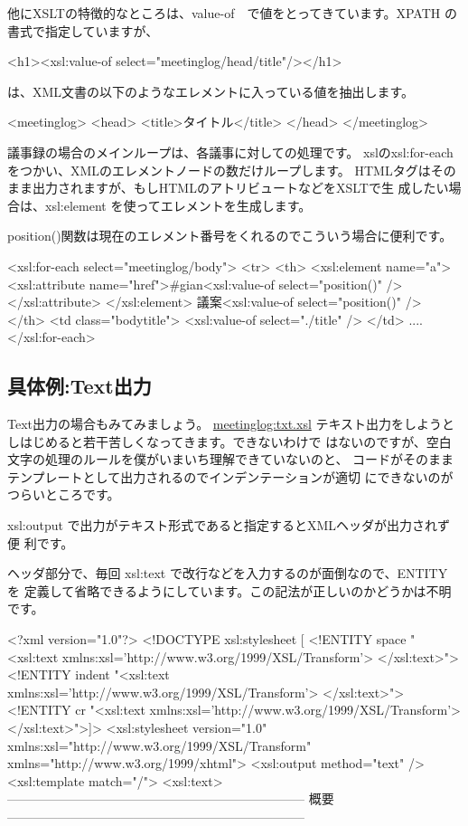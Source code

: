 \documentclass[mingoth,a4paper]{jsarticle}
\begin{document}
他にXSLTの特徴的なところは、value-of　で値をとってきています。XPATH
の書式で指定していますが、
\begin{commandline}
	<h1><xsl:value-of select="meetinglog/head/title"/></h1>
\end{commandline}

は、XML文書の以下のようなエレメントに入っている値を抽出します。
\begin{commandline}
 <meetinglog>
   <head>
     <title>タイトル</title>
   </head>
 </meetinglog> 
\end{commandline}

議事録の場合のメインループは、各議事に対しての処理です。
xslのxsl:for-eachをつかい、XMLのエレメントノードの数だけループします。
HTMLタグはそのまま出力されますが、もしHTMLのアトリビュートなどをXSLTで生
成したい場合は、xsl:element を使ってエレメントを生成します。

position()関数は現在のエレメント番号をくれるのでこういう場合に便利です。

\begin{commandline}
           <xsl:for-each select="meetinglog/body">
	      <tr>
		<th>
		  <xsl:element name="a">
		    <xsl:attribute name="href">#gian<xsl:value-of select="position()" /></xsl:attribute>
		  </xsl:element>
		  議案<xsl:value-of select="position()" />
		</th>
		<td class="bodytitle">
		  <xsl:value-of select="./title" />
		</td>
 ....
 </xsl:for-each> 
\end{commandline}

\subsection{具体例:Text出力}

Text出力の場合もみてみましょう。
\url{meetinglog:txt.xsl}
テキスト出力をしようとしはじめると若干苦しくなってきます。できないわけで
はないのですが、空白文字の処理のルールを僕がいまいち理解できていないのと、
コードがそのままテンプレートとして出力されるのでインデンテーションが適切
にできないのがつらいところです。

xsl:output で出力がテキスト形式であると指定するとXMLヘッダが出力されず便
利です。

ヘッダ部分で、毎回 xsl:text で改行などを入力するのが面倒なので、ENTITY を
定義して省略できるようにしています。この記法が正しいのかどうかは不明です。

\begin{commandline}
<?xml version="1.0"?>
<!DOCTYPE xsl:stylesheet [
<!ENTITY space  "<xsl:text xmlns:xsl='http://www.w3.org/1999/XSL/Transform'> </xsl:text>">
<!ENTITY indent "<xsl:text xmlns:xsl='http://www.w3.org/1999/XSL/Transform'>  </xsl:text>">
<!ENTITY cr     "<xsl:text xmlns:xsl='http://www.w3.org/1999/XSL/Transform'>
</xsl:text>">]>
  <xsl:stylesheet version="1.0"
    xmlns:xsl="http://www.w3.org/1999/XSL/Transform"
    xmlns="http://www.w3.org/1999/xhtml">
  <xsl:output method="text" />
  <xsl:template match="/">
    <xsl:text>-----------------------------------------------------------------------
概要
-----------------------------------------------------------------------
\end{commandline}
\end{document}

